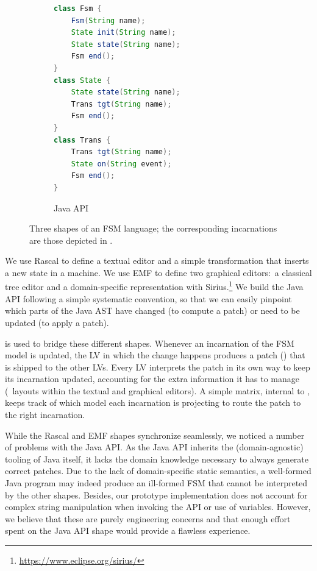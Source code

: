\begin{figure}[bt]
	\enskip
	\vrule
	\enskip
	\begin{subfigure}[b]{.35\columnwidth}
		\begin{lstlisting}[label=lst:fsm-api, language=Java, numbers=none, xleftmargin=0pt, tabsize=1]
class Fsm {
	Fsm(String name);
	State init(String name);
	State state(String name);
	Fsm end();
}
class State {
	State state(String name);
	Trans tgt(String name);
	Fsm end();
}
class Trans {
	Trans tgt(String name);
	State on(String event);
	Fsm end();
}
		\end{lstlisting}
		\caption{Java API}
	\end{subfigure}
	\caption{Three shapes of an FSM language; the corresponding incarnations are those depicted in .}
	\label{fig:3fsms}
\end{figure}

We use Rascal to define a textual editor and a simple transformation that inserts a new state in a machine.
We use EMF to define two graphical editors:~a classical tree editor and a domain-specific representation with Sirius.\footnote{\url{https://www.eclipse.org/sirius/}}
We build the Java API following a simple systematic convention, so that we can easily pinpoint which parts of the Java AST have changed (to compute a patch) or need to be updated (to apply a patch).

\prism is used to bridge these different shapes.
Whenever an incarnation of the FSM model is updated, the LV in which the change happens produces a patch (\cf{}) that is shipped to the other LVs.
Every LV interprets the patch in its own way to keep its incarnation updated, accounting for the extra information it has to manage (\eg~layouts within the textual and graphical editors).
A simple matrix, internal to \prism, keeps track of which model each incarnation is projecting to route the patch to the right incarnation.


While the Rascal and EMF shapes synchronize seamlessly, we noticed a number of problems with the Java API.
As the Java API inherits the (domain-agnostic) tooling of Java itself, it lacks the domain knowledge necessary to always generate correct patches.
Due to the lack of domain-specific static semantics, a well-formed Java program may indeed produce an ill-formed FSM that cannot be interpreted by the other shapes.
Besides, our prototype implementation does not account for complex string manipulation when invoking the API or use of variables.
However, we believe that these are purely engineering concerns and that enough effort spent on the Java API shape would provide a flawless experience.

